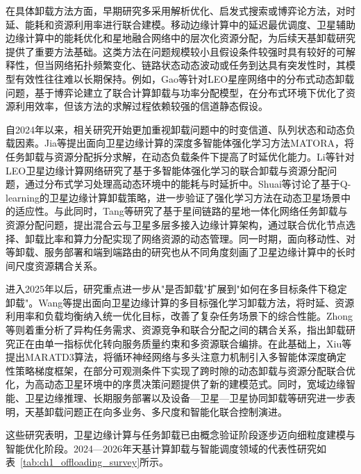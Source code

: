 在具体卸载方法方面，早期研究多采用解析优化、启发式搜索或博弈论方法，对时延、能耗和资源利用率进行联合建模。移动边缘计算中的延迟最优调度、卫星辅助边缘计算中的能耗优化和星地融合网络中的层次化资源分配，为后续天基卸载研究提供了重要方法基础\cite{ref2,Andrade2023,Sun2022,Ning2023,Zhang2023}。这类方法在问题规模较小且假设条件较强时具有较好的可解释性，但当网络拓扑频繁变化、链路状态动态波动或任务到达具有突发性时，其模型有效性往往难以长期保持。例如，Gao等针对LEO星座网络中的分布式动态卸载问题，基于博弈论建立了联合计算卸载与功率分配模型，在分布式环境下优化了资源利用效率，但该方法的求解过程依赖较强的信道静态假设\cite{ref19}。

自2024年以来，相关研究开始更加重视卸载问题中的时变信道、队列状态和动态负载因素。Jia等提出面向卫星边缘计算的深度多智能体强化学习方法MATORA，将任务卸载与资源分配拆分求解，在动态负载条件下提高了时延优化能力\cite{ref22}。Li等针对LEO卫星边缘计算网络研究了基于多智能体强化学习的联合卸载与资源分配问题，通过分布式学习处理高动态环境中的能耗与时延折中\cite{Li2024MARLComCom}。Shuai等讨论了基于Q-learning的卫星边缘计算卸载策略，进一步验证了强化学习方法在动态卫星场景中的适应性\cite{Shuai2024Qlearning}。与此同时，Tang等研究了基于星间链路的星地一体化网络任务卸载与资源分配问题，提出混合云与卫星多层多接入边缘计算架构，通过联合优化节点选择、卸载比率和算力分配实现了网络资源的动态管理\cite{ref20}。同一时期，面向移动性、对等卸载、服务部署和端到端路由的研究也从不同角度刻画了卫星边缘计算中的长时间尺度资源耦合关系\cite{Zhou2024MobilityAware,Zhang2024PeerOffloading,Tang2024TwoTimescaleJSAC,Zhai2024SECO,Qu2024E2E,Zhang2024CollaborativeTVT}。

进入2025年以后，研究重点进一步从"是否卸载"扩展到"如何在多目标条件下稳定卸载"。Wang等提出面向卫星边缘计算的多目标强化学习卸载方法，将时延、资源利用率和负载均衡纳入统一优化目标，改善了复杂任务场景下的综合性能\cite{LMCECN2025}。Zhong等则着重分析了异构任务需求、资源竞争和联合分配之间的耦合关系，指出卸载研究正在由单一指标优化转向服务质量约束和多资源联合编排\cite{Zhong2025HeterogeneousTVT}。在此基础上，Xiu等提出MARATD3算法，将循环神经网络与多头注意力机制引入多智能体深度确定性策略梯度框架，在部分可观测条件下实现了跨时隙的动态卸载与资源分配联合优化，为高动态卫星环境中的序贯决策问题提供了新的建模范式\cite{Xiu2025MARATD3}。同时，宽域边缘智能、卫星边缘推理、长期服务部署以及设备—卫星—卫星协同卸载等研究进一步表明，天基卸载问题正在向多业务、多尺度和智能化联合控制演进\cite{Zhao2025WideAreaEdge,Fan2025SEI,Feng2026LatencyAware,Liu2026DeviceSatelliteSatellite,Sun2026LLMOffloading}。

这些研究表明，卫星边缘计算与任务卸载已由概念验证阶段逐步迈向细粒度建模与智能优化阶段。2024—2026年天基计算卸载与智能调度领域的代表性研究如表~\ref{tab:ch1_offloading_survey}所示。

